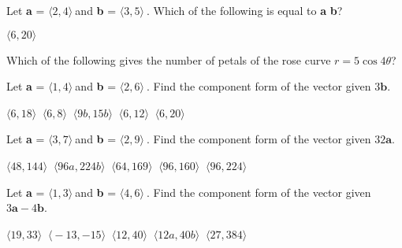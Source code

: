 \documentclass[../main.tex]{subfiles}
\begin{document}
\begin{questions}
    \question[1] Let \textbf{a} = $\big \langle 2, 4 \big \rangle\ $and \textbf{b} = $\big \langle 3, 5 \big \rangle\ $. Which of the following is equal to \textbf{a} \cdot \textbf{b}?

    \begin{oneparchoices}
        \choice $\big \langle 6, 20 \big \rangle\ $
        \end{oneparchoices}  \answerline
    
    \question[1] Which of the following gives the number of petals of the rose curve $r = 5\cos4\theta$?
    
    \begin{oneparchoices}
        \end{oneparchoices}  \answerline
    
    \question[1] Let \textbf{a} = $\big \langle 1, 4 \big \rangle\ $and \textbf{b} = $\big \langle 2, 6 \big \rangle\ $. Find the component form of the vector given $3\textbf{b}$.
    
    \begin{oneparchoices}
        \choice $\big \langle 6, 18 \big \rangle\ $
        \choice $\big \langle 6, 8 \big \rangle\ $
        \choice $\big \langle 9b, 15b \big \rangle\ $
        \choice $\big \langle 6, 12 \big \rangle\ $
        \choice $\big \langle 6, 20 \big \rangle\ $
        \end{oneparchoices}  \answerline
    
    \question[1] Let \textbf{a} = $\big \langle 3, 7 \big \rangle\ $and \textbf{b} = $\big \langle 2, 9 \big \rangle\ $. Find the component form of the vector given $32\textbf{a}$.
    
    \begin{oneparchoices}
        \choice $\big \langle 48, 144 \big \rangle\ $
        \choice $\big \langle 96a, 224b \big \rangle\ $
        \choice $\big \langle 64, 169 \big \rangle\ $
        \choice $\big \langle 96, 160 \big \rangle\ $
        \choice $\big \langle 96, 224 \big \rangle\ $
        \end{oneparchoices}  \answerline
    
    \question[1] Let \textbf{a} = $\big \langle 1, 3 \big \rangle\ $and \textbf{b} = $\big \langle 4, 6 \big \rangle\ $. Find the component form of the vector given $3\textbf{a} - 4\textbf{b}$.
    
    \begin{oneparchoices}
        \choice $\big \langle 19, 33 \big \rangle\ $
        \choice $\big \langle -13, -15 \big \rangle\ $
        \choice $\big \langle 12, 40 \big \rangle\ $
        \choice $\big \langle 12a, 40b \big \rangle\ $
        \choice $\big \langle 27, 384 \big \rangle\ $
        \end{oneparchoices}  \answerline
    \end{questions}
\end{document}
